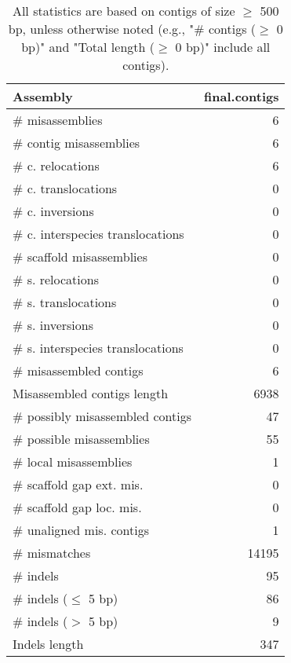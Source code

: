 \documentclass[12pt,a4paper]{article}
\begin{document}
\begin{table}[ht]
\begin{center}
\caption{All statistics are based on contigs of size $\geq$ 500 bp, unless otherwise noted (e.g., "\# contigs ($\geq$ 0 bp)" and "Total length ($\geq$ 0 bp)" include all contigs).}
\begin{tabular}{|l*{1}{|r}|}
\hline
Assembly & final.contigs \\ \hline
\# misassemblies & 6 \\ \hline
\hspace{2mm}\# contig misassemblies & 6 \\ \hline
\hspace{5mm}\# c. relocations & 6 \\ \hline
\hspace{5mm}\# c. translocations & 0 \\ \hline
\hspace{5mm}\# c. inversions & 0 \\ \hline
\hspace{5mm}\# c. interspecies translocations & 0 \\ \hline
\hspace{2mm}\# scaffold misassemblies & 0 \\ \hline
\hspace{5mm}\# s. relocations & 0 \\ \hline
\hspace{5mm}\# s. translocations & 0 \\ \hline
\hspace{5mm}\# s. inversions & 0 \\ \hline
\hspace{5mm}\# s. interspecies translocations & 0 \\ \hline
\# misassembled contigs & 6 \\ \hline
Misassembled contigs length & 6938 \\ \hline
\# possibly misassembled contigs & 47 \\ \hline
\hspace{5mm}\# possible misassemblies & 55 \\ \hline
\# local misassemblies & 1 \\ \hline
\# scaffold gap ext. mis. & 0 \\ \hline
\# scaffold gap loc. mis. & 0 \\ \hline
\# unaligned mis. contigs & 1 \\ \hline
\# mismatches & 14195 \\ \hline
\# indels & 95 \\ \hline
\hspace{5mm}\# indels ($\leq$ 5 bp) & 86 \\ \hline
\hspace{5mm}\# indels ($>$ 5 bp) & 9 \\ \hline
Indels length & 347 \\ \hline
\end{tabular}
\end{center}
\end{table}
\end{document}
